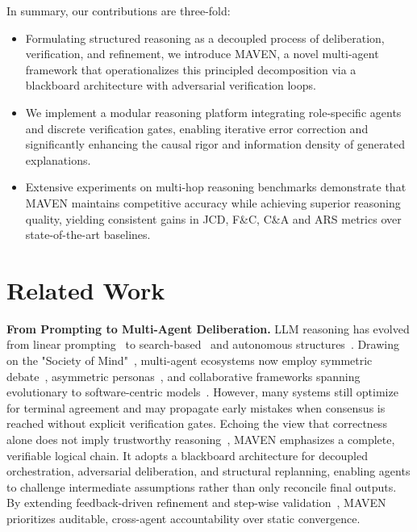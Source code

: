 \documentclass{article}
\begin{document}
In summary, our contributions are three-fold:

\begin{itemize}[nosep, leftmargin=1.5em]
    \item  Formulating structured reasoning as a decoupled process of deliberation, verification, and refinement, we introduce MAVEN, a novel multi-agent framework that operationalizes this principled decomposition via a blackboard architecture with adversarial verification loops.
    \item We implement a modular reasoning platform integrating role-specific agents and discrete verification gates, enabling iterative error correction and significantly enhancing the causal rigor and information density of generated explanations.

    \item Extensive experiments on multi-hop reasoning benchmarks demonstrate that MAVEN maintains competitive accuracy while achieving superior reasoning quality, yielding consistent gains in JCD, F\&C, C\&A and ARS metrics over state-of-the-art baselines.
\end{itemize}

\section{Related Work}
\textbf{From Prompting to Multi-Agent Deliberation.}
LLM reasoning has evolved from linear prompting~\citep{wei2022chain,zhou2022least,wang2023plan} to search-based~\citep{yao2023tree,besta2024graph} and autonomous structures~\citep{zhou2024self}. Drawing on the "Society of Mind"~\citep{minsky1988society}, multi-agent ecosystems now employ symmetric debate~\citep{chen2024reconcile,du2023improving}, asymmetric personas~\citep{chan2023chateval,wang2024mixture}, and collaborative frameworks spanning evolutionary to software-centric models~\citep{wynn2025talk,yuan2024evoagent,nascimento2023self,qian2023experimental,zhao2024electoral,wu2024spontaneous,qian2024chatdev,hong2024metagpt}. However, many systems still optimize for terminal agreement and may propagate early mistakes when consensus is reached without explicit verification gates. Echoing the view that correctness alone does not imply trustworthy reasoning~\citep{kadavath2022knowledge,zhao2024knowing}, MAVEN emphasizes a complete, verifiable logical chain. It adopts a blackboard architecture for decoupled orchestration, adversarial deliberation, and structural replanning, enabling agents to challenge intermediate assumptions rather than only reconcile final outputs. By extending feedback-driven refinement and step-wise validation~\citep{madaan2023selfrefine,shinn2023reflexion,lightman2024verify}, MAVEN prioritizes auditable, cross-agent accountability over static convergence.
\end{document}
